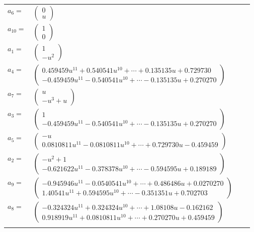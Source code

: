 \documentclass[1p]{elsarticle_modified}
\theoremstyle{definition}
\begin{document}
\begin{tabular}{m{7pt} m{180pt} m{7pt} m{180pt} }
\flushright $a_{6}=$&$\begin{pmatrix}0\\u\end{pmatrix}$ \\
\flushright $a_{10}=$&$\begin{pmatrix}1\\0\end{pmatrix}$ \\
\flushright $a_{1}=$&$\begin{pmatrix}1\\- u^2\end{pmatrix}$ \\
\flushright $a_{4}=$&$\begin{pmatrix}0.459459 u^{11}+0.540541 u^{10}+\cdots+0.135135 u+0.729730\\-0.459459 u^{11}-0.540541 u^{10}+\cdots-0.135135 u+0.270270\end{pmatrix}$ \\
\flushright $a_{7}=$&$\begin{pmatrix}u\\- u^3+u\end{pmatrix}$ \\
\flushright $a_{3}=$&$\begin{pmatrix}1\\-0.459459 u^{11}-0.540541 u^{10}+\cdots-0.135135 u+0.270270\end{pmatrix}$ \\
\flushright $a_{5}=$&$\begin{pmatrix}- u\\0.0810811 u^{11}-0.0810811 u^{10}+\cdots+0.729730 u-0.459459\end{pmatrix}$ \\
\flushright $a_{2}=$&$\begin{pmatrix}- u^2+1\\-0.621622 u^{11}-0.378378 u^{10}+\cdots-0.594595 u+0.189189\end{pmatrix}$ \\
\flushright $a_{9}=$&$\begin{pmatrix}-0.945946 u^{11}-0.0540541 u^{10}+\cdots+0.486486 u+0.0270270\\1.40541 u^{11}+0.594595 u^{10}+\cdots-0.351351 u+0.702703\end{pmatrix}$ \\
\flushright $a_{8}=$&$\begin{pmatrix}-0.324324 u^{11}+0.324324 u^{10}+\cdots+1.08108 u-0.162162\\0.918919 u^{11}+0.0810811 u^{10}+\cdots+0.270270 u+0.459459\end{pmatrix}$\\&\end{tabular}
\end{document}
